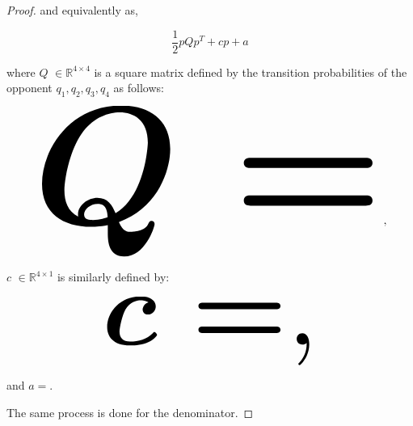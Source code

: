 \documentclass[10pt]{article}
\newcommand{\R}{\mathbb{R}}
\begin{document}
\begin{proof}
    and equivalently as,

    \[\frac{1}{2}pQp^T + cp + a\]

    where \(Q\) \(\in \R^{4\times4}\) is a square matrix defined by the
    transition probabilities of the opponent \(q_1, q_2, q_3, q_4\) as follows:

    \begin{equation*}
        \resizebox{0.9\linewidth}{!}{\arraycolsep=2.5pt%
        \boldmath\(
        Q = \)},
    \end{equation*}

    \(c\) \(\in \R^{4 \times 1}\) is similarly defined by:

    \begin{equation*}
        \resizebox{0.55\linewidth}{!}{\arraycolsep=2.5pt%
        \boldmath\(c = \),}
    \end{equation*}

    and \(a = \).

    The same process is done for the denominator.
\end{proof}
\end{document}
